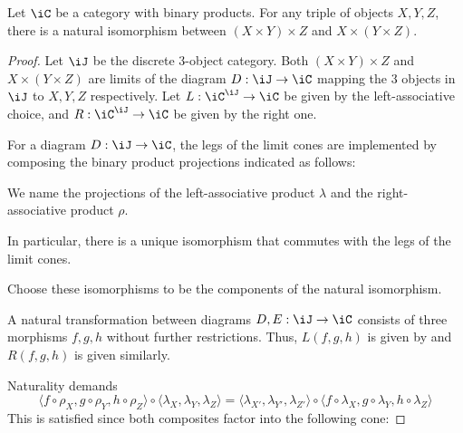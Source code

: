 \documentclass{amsart}
\begin{document}
\begin{eg}
  Let $\iC$ be a category with binary products.
  For any triple of objects $X, Y, Z$, there is a natural isomorphism between $(X \times Y) \times Z$ and $X \times (Y \times Z)$.
\end{eg}
\begin{proof}
  Let $\iJ$ be the discrete 3-object category.
  Both $(X \times Y) \times Z$ and $X \times (Y \times Z)$ are limits of the diagram $D : \iJ \to \iC$ mapping the 3 objects in $\iJ$ to $X, Y, Z$ respectively.
  Let $L : \iC^{\iJ} \to \iC$ be given by the left-associative choice, and $R : \iC^{\iJ} \to \iC$ be given by the right one.
  
  For a diagram $D : \iJ \to \iC$, the legs of the limit cones are implemented by composing the binary product projections indicated as follows:  

  We name the projections of the left-associative product $\lambda$ and the right-associative product $\rho$.
  
  In particular, there is a unique isomorphism that commutes with the legs of the limit cones.
  
  Choose these isomorphisms to be the components of the natural isomorphism.

  A natural transformation between diagrams $D, E : \iJ \to \iC$ consists of three morphisms $f,g,h$ without further restrictions.
  Thus, $L(f,g,h)$ is given by 
  and $R(f,g,h)$ is given similarly.

  Naturality demands
  \[
    \langle f \circ \rho_{X}, g \circ \rho_{Y}, h \circ \rho_{Z} \rangle \circ \langle \lambda_{X}, \lambda_{Y}, \lambda_{Z} \rangle
    =
    \langle \lambda_{X'}, \lambda_{Y'}, \lambda_{Z'} \rangle \circ \langle f \circ \lambda_{X}, g \circ \lambda_{Y}, h \circ \lambda_{Z} \rangle
  \]
  This is satisfied since both composites factor into the following cone:  
\end{proof}



\end{document}

